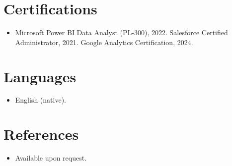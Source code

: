 \documentclass[11pt,a4paper,sans]{moderncv}
\begin{document}

\section{Certifications}
\vspace{1pt}
\begin{itemize}
\item {Microsoft Power BI Data Analyst (PL-300), 2022. Salesforce Certified Administrator, 2021. Google Analytics Certification, 2024.}
\end{itemize}


\section{Languages}
\vspace{1pt}
\begin{itemize}
\item {English (native).}
\end{itemize}


\section{References}
\vspace{1pt}
\begin{itemize}
\item{Available upon request.}
\end{itemize}
\end{document}
